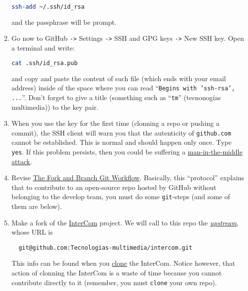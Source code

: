 \begin{enumerate}
  \begin{lstlisting}[language=bash]  
    ssh-add ~/.ssh/id_rsa
  \end{lstlisting}

  and the passphrase will be prompt.
  
\item Go now to GitHub \texttt{->} Settings \texttt{->} SSH and GPG
  keys \texttt{->} New SSH key. Open a terminal and write:
  
  \begin{lstlisting}[language=bash]  
    cat .ssh/id_rsa.pub
  \end{lstlisting}

  and copy and paste the content of such file (which ends with your
  email address) inside of the space where you can read
  ``\texttt{Begins with 'ssh-rsa', ...}''. Don't forget to give a
  title (something such as ``\texttt{tm}'' (tecnonogías multimedia))
  to the key pair.
  
\item When you use the key for the first time (clonning a repo or
  pushing a commit), the SSH client will warn you that the autenticity
  of \texttt{github.com} cannot be established. This is normal and
  should happen only once. Type \texttt{yes}. If this problem
  persists, then you could be suffering a
  \href{https://en.wikipedia.org/wiki/Man-in-the-middle_attack}{man-in-the-middle
    attack}.

\item Revise
  \href{https://github.com/vicente-gonzalez-ruiz/fork_and_branch_git_workflow}{The
    Fork and Branch Git Workflow}. Basically, this ``protocol''
  explains that to contribute to an open-source repo hosted by GitHub
  without belonging to the develop team, you must do some
  \texttt{git}-steps (and some of them are below).

\item Make a fork of the
  \href{https://github.com/Tecnologias-multimedia/intercom}{InterCom}
  project. We will call to this repo the
  \href{https://docs.github.com/en/github/getting-started-with-github/github-glossary#upstream}{\emph{upstream}}, whose URL is
\begin{verbatim}
  git@github.com:Tecnologias-multimedia/intercom.git
\end{verbatim}        
  This info can be found when you
  \href{https://docs.github.com/en/github/creating-cloning-and-archiving-repositories/cloning-a-repository}{clone}
  the InterCom. Notice however, that action of clonning the InterCom
  is a waste of time because you cannot contribute directly to it
  (remember, you must \texttt{clone} your own repo).


\end{enumerate}
